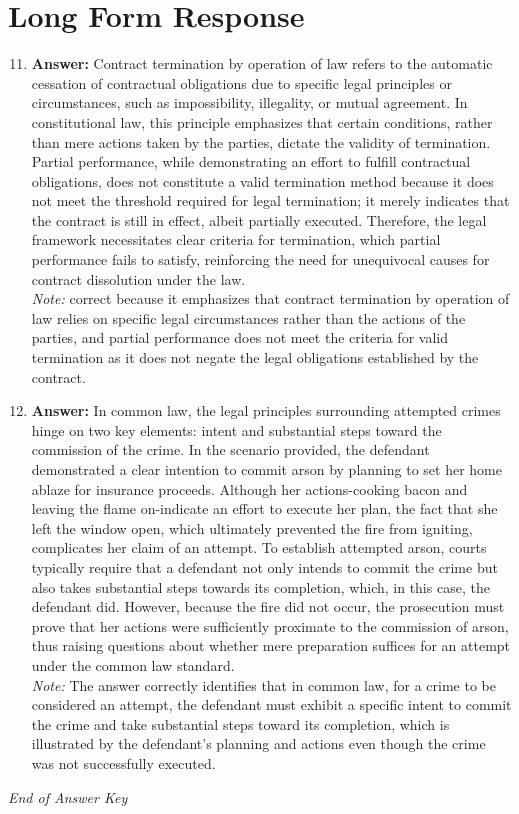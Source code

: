 \documentclass[12pt]{article}
\begin{document}
\section*{Long Form Response}
\begin{enumerate}[label=\arabic*.]
\setcounter{enumi}{10}
\item \textbf{Answer:} Contract termination by operation of law refers to the automatic cessation of contractual obligations due to specific legal principles or circumstances, such as impossibility, illegality, or mutual agreement. In constitutional law, this principle emphasizes that certain conditions, rather than mere actions taken by the parties, dictate the validity of termination. Partial performance, while demonstrating an effort to fulfill contractual obligations, does not constitute a valid termination method because it does not meet the threshold required for legal termination; it merely indicates that the contract is still in effect, albeit partially executed. Therefore, the legal framework necessitates clear criteria for termination, which partial performance fails to satisfy, reinforcing the need for unequivocal causes for contract dissolution under the law.
\\ \textit{Note:} correct because it emphasizes that contract termination by operation of law relies on specific legal circumstances rather than the actions of the parties, and partial performance does not meet the criteria for valid termination as it does not negate the legal obligations established by the contract.
\item \textbf{Answer:} In common law, the legal principles surrounding attempted crimes hinge on two key elements: intent and substantial steps toward the commission of the crime. In the scenario provided, the defendant demonstrated a clear intention to commit arson by planning to set her home ablaze for insurance proceeds. Although her actions-cooking bacon and leaving the flame on-indicate an effort to execute her plan, the fact that she left the window open, which ultimately prevented the fire from igniting, complicates her claim of an attempt. To establish attempted arson, courts typically require that a defendant not only intends to commit the crime but also takes substantial steps towards its completion, which, in this case, the defendant did. However, because the fire did not occur, the prosecution must prove that her actions were sufficiently proximate to the commission of arson, thus raising questions about whether mere preparation suffices for an attempt under the common law standard.
\\ \textit{Note:} The answer correctly identifies that in common law, for a crime to be considered an attempt, the defendant must exhibit a specific intent to commit the crime and take substantial steps toward its completion, which is illustrated by the defendant's planning and actions even though the crime was not successfully executed.
\end{enumerate}

\vfill
\noindent\textit{End of Answer Key}
\end{document}
